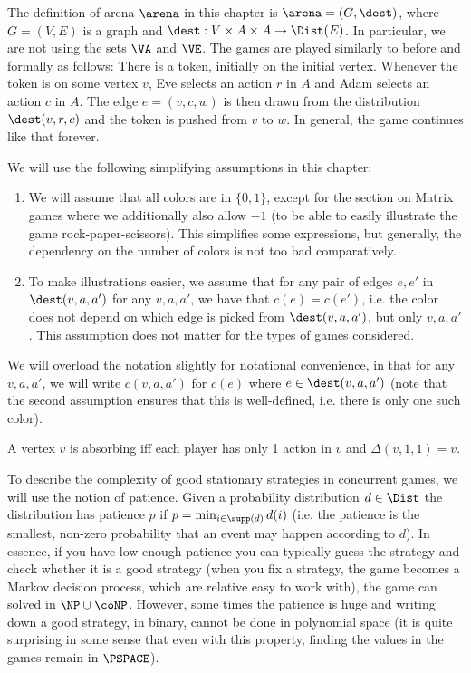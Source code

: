 The definition of arena $\arena$ in this chapter is $\arena=(G,\dest)$, where $G=(V,E)$ is a graph and $\dest:V\times A\times A\rightarrow \Dist(E)$. In particular, we are not using the sets $\VA$ and $\VE$.
The games are played similarly to before and formally as follows: 
There is a token, initially on the initial vertex. 
Whenever the token is on some vertex $v$, 
Eve selects an action $r$ in $A$ and Adam selects an action $c$ in $A$. The edge $e=(v,c,w)$ is then drawn from the distribution $\dest(v,r,c)$ and the token is pushed from $v$ to $w$.
 In general, the game continues like that forever.

We will use the following simplifying assumptions in this chapter:
\begin{enumerate}
\item We will assume that all colors are in $\{0,1\}$, except for the section on Matrix games where we additionally also allow $-1$ (to be able to easily illustrate the game rock-paper-scissors). This simplifies some expressions, but generally, the dependency on the number of colors is not too bad comparatively.
\item To make illustrations easier, we assume that for any pair of edges $e,e'$ in $\dest(v,a,a')$ for any $v,a,a'$, we have that $c(e)=c(e')$, i.e. the color does not depend on which edge is picked from $\dest(v,a,a')$, but only $v,a,a'$. This assumption does not matter for the types of games considered.
\end{enumerate}

We will overload the notation slightly for notational convenience, in that for any $v,a,a'$, we will write $c(v,a,a')$ for $c(e)$ where $e\in \dest(v,a,a')$ (note that the second assumption ensures that this is well-defined, i.e. there is only one such color).


A vertex $v$ is absorbing iff each player has only 1 action in $v$ and $\Delta(v,1,1)=v$.

To describe the complexity of good stationary strategies in concurrent games, we will use the notion of patience. Given a probability distribution $d\in \Dist$ the distribution has patience $p$ if $p=\min_{i\in \supp(d)} d(i)$ (i.e. the patience is the smallest, non-zero probability that an event may happen according to $d$).
In essence, if you have low enough patience you can typically guess the strategy and check whether it is a good strategy (when you fix a strategy, the game becomes a Markov decision process, which are relative easy to work with), the game can solved in $\NP\cup \coNP$. However, some times the patience is huge and writing down a good strategy, in binary, cannot be done in polynomial space (it is quite surprising in some sense that even with this property, finding the values in the games remain in $\PSPACE$).

